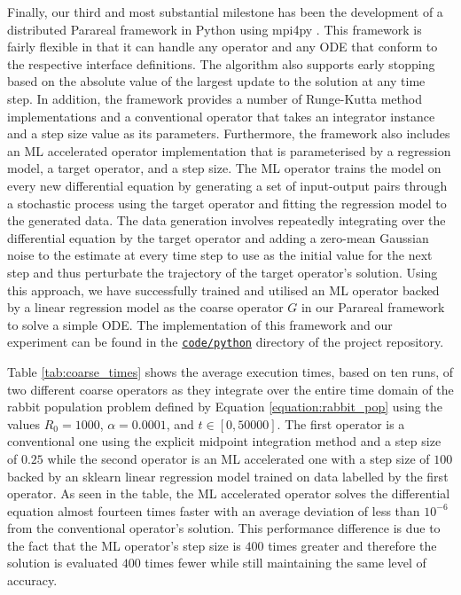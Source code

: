 \documentclass{article}
\begin{document}
Finally, our third and most substantial milestone has been the development of a distributed Parareal framework in Python using mpi4py \cite{dalcin2005}. This framework is fairly flexible in that it can handle any operator and any ODE that conform to the respective interface definitions. The algorithm also supports early stopping based on the absolute value of the largest update to the solution at any time step. In addition, the framework provides a number of Runge-Kutta method implementations and a conventional operator that takes an integrator instance and a step size value as its parameters. Furthermore, the framework also includes an ML accelerated operator implementation that is parameterised by a regression model, a target operator, and a step size. The ML operator trains the model on every new differential equation by generating a set of input-output pairs through a stochastic process using the target operator and fitting the regression model to the generated data. The data generation involves repeatedly integrating over the differential equation by the target operator and adding a zero-mean Gaussian noise to the estimate at every time step to use as the initial value for the next step and thus perturbate the trajectory of the target operator's solution. Using this approach, we have successfully trained and utilised an ML operator backed by a linear regression model as the coarse operator $G$ in our Parareal framework to solve a simple ODE. The implementation of this framework and our experiment can be found in the \href{https://git.ecdf.ed.ac.uk/msc-19-20/s1984842/blob/master/code/python/}{\texttt{code/python}} directory of the project repository.

Table \ref{tab:coarse_times} shows the average execution times, based on ten runs, of two different coarse operators as they integrate over the entire time domain of the rabbit population problem defined by Equation \ref{equation:rabbit_pop} using the values $R_0 = 1000$, $\alpha = 0.0001$, and $t \in [0, 50000]$. The first operator is a conventional one using the explicit midpoint integration method and a step size of $0.25$ while the second operator is an ML accelerated one with a step size of $100$ backed by an sklearn \cite{pedregosa2011} linear regression model trained on data labelled by the first operator. As seen in the table, the ML accelerated operator solves the differential equation almost fourteen times faster with an average deviation of less than $10^{-6}$ from the conventional operator's solution. This performance difference is due to the fact that the ML operator's step size is $400$ times greater and therefore the solution is evaluated $400$ times fewer while still maintaining the same level of accuracy.
\end{document}
